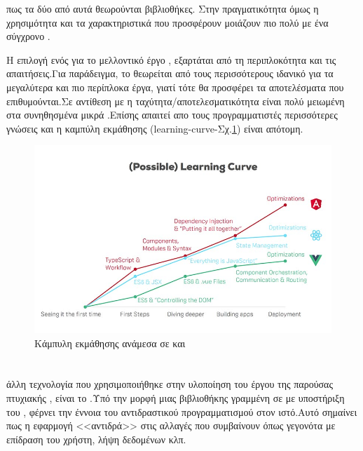  πως τα δύο από αυτά θεωρούνται βιβλιοθήκες. Στην πραγματικότητα όμως η χρησιμότητα και τα χαρακτηριστικά που προσφέρουν μοιάζουν πιο πολύ με ένα σύγχρονο .\par
Η επιλογή ενός για το μελλοντικό έργο , εξαρτάται από τη περιπλοκότητα και τις απαιτήσεις.Για παράδειγμα, το  θεωρείται από τους περισσότερους ιδανικό για τα μεγαλύτερα και πιο περίπλοκα έργα, γιατί τότε θα προσφέρει τα αποτελέσματα που επιθυμούνται.Σε αντίθεση με  η ταχύτητα/αποτελεσματικότητα είναι πολύ μειωμένη στα συνηθησμένα μικρά .Επίσης απαιτεί απο τους προγραμματιστές περισσότερες γνώσεις και η καμπύλη εκμάθησης (\textlatin{learning-curve}-Σχ.\ref{fig:angular_vue_react_learning_curve}) είναι απότομη.
\begin{figure}[ht]
\centering
\includegraphics[scale=0.3]{images/angular-react-vue-learning-curve.jpg}
\caption{Κάμπυλη εκμάθησης ανάμεσα σε  και }
\label{fig:angular_vue_react_learning_curve}
\end{figure}

\section{}
 άλλη τεχνολογία που χρησιμοποιήθηκε στην υλοποίηση του έργου της παρούσας πτυχιακής , είναι το .Υπό την μορφή μιας βιβλιοθήκης γραμμένη σε  με υποστήριξη του  , φέρνει την έννοια του αντιδραστικού προγραμματισμού στον ιστό.Αυτό σημαίνει πως η εφαρμογή <<αντιδρά>> στις αλλαγές που συμβαίνουν όπως γεγονότα με επίδραση του χρήστη, λήψη δεδομένων κλπ.

